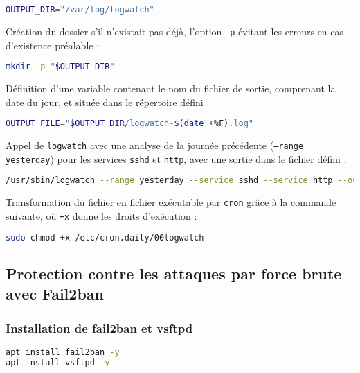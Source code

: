 \documentclass[12pt,a4paper]{article}
\begin{document}
\begin{lstlisting}[language=bash]
OUTPUT_DIR="/var/log/logwatch"
\end{lstlisting}

Création du dossier s’il n’existait pas déjà, l’option \texttt{-p} évitant les erreurs en cas d’existence préalable :

\begin{lstlisting}[language=bash]
mkdir -p "$OUTPUT_DIR"
\end{lstlisting}

Définition d'une variable contenant le nom du fichier de sortie, comprenant la date du jour, et située dans le répertoire défini :

\begin{lstlisting}[language=bash]
OUTPUT_FILE="$OUTPUT_DIR/logwatch-$(date +%F).log"
\end{lstlisting}

Appel de \texttt{logwatch} avec une analyse de la journée précédente (\texttt{--range yesterday}) pour les services \texttt{sshd} et \texttt{http}, avec une sortie dans le fichier défini :

\begin{lstlisting}[language=bash]
/usr/sbin/logwatch --range yesterday --service sshd --service http --output file --format text --filename "$OUTPUT_FILE"
\end{lstlisting}

Transformation du fichier en fichier exécutable par \texttt{cron} grâce à la commande suivante, où \texttt{+x} donne les droits d’exécution :

\begin{lstlisting}[language=bash]
sudo chmod +x /etc/cron.daily/00logwatch
\end{lstlisting}


\subsection{Protection contre les attaques par force brute avec Fail2ban}

\subsubsection{Installation de fail2ban et vsftpd}

\begin{lstlisting}[language=bash]
apt install fail2ban -y
apt install vsftpd -y
\end{lstlisting}
\end{document}

